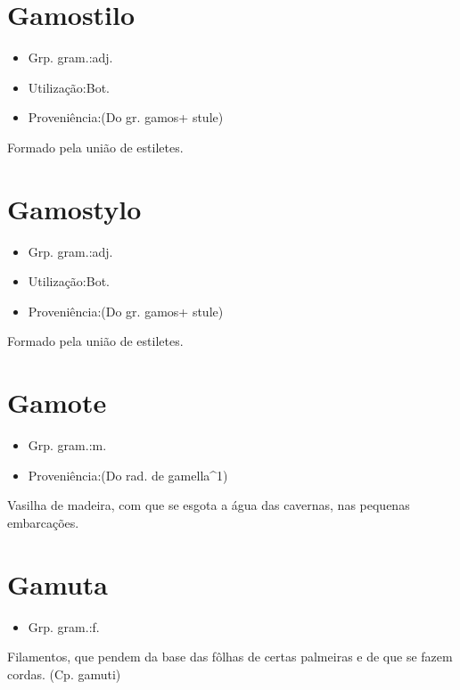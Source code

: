 \section{Gamostilo}
\begin{itemize}
\item {Grp. gram.:adj.}
\end{itemize}
\begin{itemize}
\item {Utilização:Bot.}
\end{itemize}
\begin{itemize}
\item {Proveniência:(Do gr. \textunderscore gamos\textunderscore  + \textunderscore stule\textunderscore )}
\end{itemize}
Formado pela união de estiletes.
\section{Gamostylo}
\begin{itemize}
\item {Grp. gram.:adj.}
\end{itemize}
\begin{itemize}
\item {Utilização:Bot.}
\end{itemize}
\begin{itemize}
\item {Proveniência:(Do gr. \textunderscore gamos\textunderscore  + \textunderscore stule\textunderscore )}
\end{itemize}
Formado pela união de estiletes.
\section{Gamote}
\begin{itemize}
\item {Grp. gram.:m.}
\end{itemize}
\begin{itemize}
\item {Proveniência:(Do rad. de \textunderscore gamella\textunderscore ^1)}
\end{itemize}
Vasilha de madeira, com que se esgota a água das cavernas, nas pequenas embarcações.
\section{Gamuta}
\begin{itemize}
\item {Grp. gram.:f.}
\end{itemize}
Filamentos, que pendem da base das fôlhas de certas palmeiras e de que se fazem cordas.
(Cp. \textunderscore gamuti\textunderscore )
